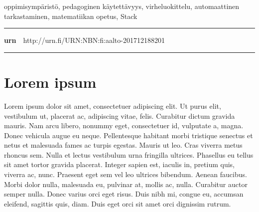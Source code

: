 \begin{spacing}{.88}
{\parindent0pt %

\parbox[t]{121.6mm}{\raggedright\small oppimisympäristö, pedagoginen käytettävyys, virheluokittelu, automaattinen tarkastaminen, matematiikan opetus, Stack}

\vspace{.5mm}\rule{\textwidth}{.75pt}

{\fontsize{10.5pt}{10.5pt}\bfseries\sffamily\lsstyle urn}~~{\small http://urn.fi/URN:NBN:fi:aalto-201712188201}

\vspace{-2.4mm}\rule{\textwidth}{.75pt}

} %
\end{spacing}

\restoregeometry  %




\newpage

\tableofcontents


\newpage


\chapter{Lorem ipsum}

Lorem ipsum dolor sit amet, consectetuer adipiscing elit. Ut purus
elit, vestibulum ut, placerat ac, adipiscing vitae, felis. Curabitur
dictum gravida mauris. Nam arcu libero, nonummy eget, consectetuer id,
vulputate a, magna. Donec vehicula augue eu neque. Pellentesque
habitant morbi tristique senectus et netus et malesuada fames ac
turpis egestas. Mauris ut leo. Cras viverra metus rhoncus sem. Nulla
et lectus vestibulum urna fringilla ultrices. Phasellus eu tellus sit
amet tortor gravida placerat. Integer sapien est, iaculis in, pretium
quis, viverra ac, nunc. Praesent eget sem vel leo ultrices
bibendum. Aenean faucibus. Morbi dolor nulla, malesuada eu, pulvinar
at, mollis ac, nulla. Curabitur auctor semper nulla.  Donec varius
orci eget risus. Duis nibh mi, congue eu, accumsan eleifend, sagittis
quis, diam. Duis eget orci sit amet orci dignissim rutrum.

